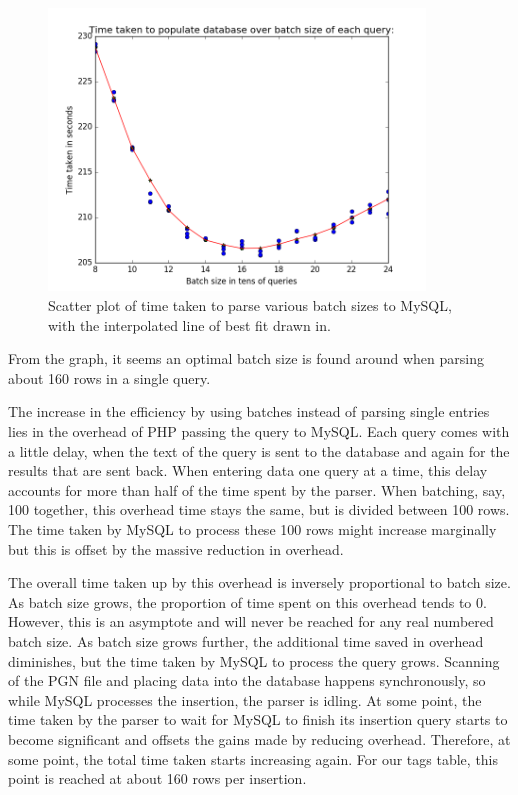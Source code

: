 \documentclass{article}
\begin{document}
\begin{figure}[h]
	\includegraphics[width=10cm]{graph_batch_interpolation}
	\caption{Scatter plot of time taken to parse various batch sizes to
	MySQL, with the interpolated line of best fit drawn in.}
	\label{figure:1}
\end{figure}

From the graph, it seems an optimal batch size is found around when parsing
about 160 rows in a single query.

The increase in the efficiency by using batches instead of parsing single
entries lies in the overhead of PHP passing the query to MySQL.  Each
query comes with a little delay, when the text of the query is sent to the
database and again for the results that are sent back.  When entering data
one query at a time, this delay accounts for more than half of the time spent
by the parser.  When batching, say, 100 together, this overhead time stays
the same, but is divided between 100 rows.  The time taken by MySQL to
process these 100 rows might increase marginally but this is offset by the
massive reduction in overhead.

The overall time taken up by this overhead is inversely proportional to
batch size.  As batch size grows, the proportion of time spent on this
overhead tends to 0. However, this is an asymptote and will never be reached
for any real numbered batch size.  As batch size grows further, the additional
time saved in overhead diminishes, but the time taken by MySQL to process the
query grows.  Scanning of the PGN file and placing data into the database
happens synchronously, so while MySQL processes the insertion, the parser is
idling.  At some point, the time taken by the parser to wait for MySQL to
finish its insertion query starts to become significant and offsets the
gains made by reducing overhead.  Therefore, at some point, the total time
taken starts increasing again.  For our tags table, this point is reached
at about 160 rows per insertion.
\end{document}
